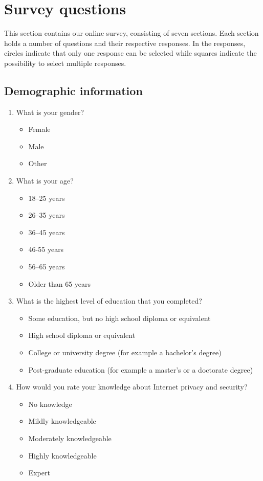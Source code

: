 \section{Survey questions}
This section contains our online survey, consisting of seven sections.  Each
section holds a number of questions and their respective responses.  In the
responses, circles indicate that only one response can be selected while squares
indicate the possibility to select multiple responses.

\subsection{Demographic information}
\begin{enumerate}
    \item What is your gender?
        \begin{itemize}[label=$\Circle$]
            \item Female
            \item Male
            \item Other
        \end{itemize}

    \item What is your age?
        \begin{itemize}[label=$\Circle$]
            \item 18--25 years
            \item 26--35 years
            \item 36--45 years
            \item 46-55 years
            \item 56--65 years
            \item Older than 65 years
        \end{itemize}

    \item What is the highest level of education that you completed?
        \begin{itemize}[label=$\Circle$]
            \item Some education, but no high school diploma or equivalent
            \item High school diploma or equivalent
            \item College or university degree (for example a bachelor's degree)
            \item Post-graduate education (for example a master's or a doctorate degree)
        \end{itemize}

    \item How would you rate your knowledge about Internet privacy and security?
        \begin{itemize}[label=$\Circle$]
            \item No knowledge
            \item Mildly knowledgeable
            \item Moderately knowledgeable
            \item Highly knowledgeable
            \item Expert
        \end{itemize}
\end{enumerate}

